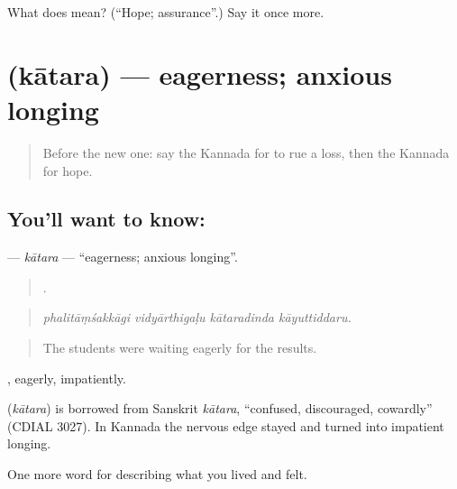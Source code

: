 \begin{tcolorbox}[breakable,colback=teal!4,colframe=teal!35!black,title={Before you move on}]
What does  mean? (\textquotedblleft{}Hope; assurance\textquotedblright{}.) Say it once more.
\end{tcolorbox}
\section[\texorpdfstring{\kn{ಕಾತರ} (kātara)}{ಕಾತರ (kātara)}]{ (kātara) — eagerness; anxious longing}

\label{lesson:KA-C496-katara}



\begin{quote}
Before the new one: say the Kannada for to rue a loss, then the Kannada for hope.
\end{quote}

\subsection*{You'll want to know: }
\textbf{} — \emph{kātara} — \textquotedblleft{}eagerness; anxious longing\textquotedblright{}.

\begin{quote}
   .
\end{quote}

\begin{quote}
\emph{phalitāṃśakkāgi vidyārthigaḷu kātaradinda kāyuttiddaru.}
\end{quote}

\begin{quote}
The students were waiting eagerly for the results.
\end{quote}

, eagerly, impatiently.

\begin{cousinweb}
\textbf{} (\emph{kātara}) is borrowed from Sanskrit \emph{kātara}, \textquotedblleft{}confused, discouraged, cowardly\textquotedblright{} (CDIAL 3027). In Kannada the nervous edge stayed and turned into impatient longing.
\end{cousinweb}

\begin{grammarlens}[title={What you've built}]
One more word for describing what you lived and felt.
\end{grammarlens}

